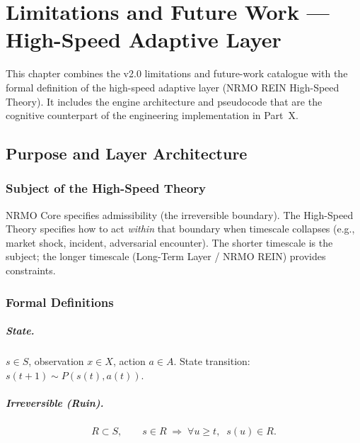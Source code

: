
\chapter{Limitations and Future Work ---
High-Speed Adaptive Layer}
\label{ch:limitations}

This chapter combines the v2.0 limitations and future-work catalogue
with the formal definition of the high-speed adaptive layer
(NRMO REIN High-Speed Theory). It includes the engine architecture
and pseudocode that are the cognitive counterpart of the engineering
implementation in Part~X.

\section{Purpose and Layer Architecture}
\label{sec:limit-purpose}

\subsection{Subject of the High-Speed Theory}

NRMO Core specifies admissibility (the irreversible boundary). The
High-Speed Theory specifies how to act \emph{within} that boundary
when timescale collapses (e.g., market shock, incident, adversarial
encounter). The shorter timescale is the subject; the longer
timescale (Long-Term Layer / NRMO REIN) provides constraints.

\subsection{Formal Definitions}

\paragraph{State.}
$s \in S$, observation $x \in X$, action $a \in A$. State
transition: $s(t+1) \sim P(s(t), a(t))$.

\paragraph{Irreversible (Ruin).}

\begin{equation}
R \subset S, \qquad
s \in R \;\Rightarrow\; \forall u \ge t,\;\; s(u) \in R.
\end{equation}

